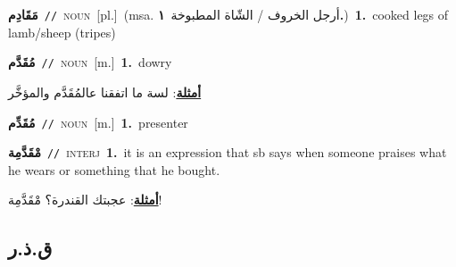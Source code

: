 \documentclass[10pt,a4paper,twoside]{article} %
\begin{document}
\begin{multicols}{2}
{\setlength\topsep{0pt}\textbf{\foreignlanguage{arabic}{مَقَادِم}}\ {\color{gray}\texttt{//}\color{black}}\ \textsc{noun}\ [pl.]\ \color{gray}(msa. \foreignlanguage{arabic}{أرجل الخروف / الشّاة المطبوخة}~\foreignlanguage{arabic}{\textbf{١.}})\color{black}\ \textbf{1.}~cooked legs of lamb/sheep (tripes)\ } \vspace{2mm}

{\setlength\topsep{0pt}\textbf{\foreignlanguage{arabic}{مُقَدَّم}}\ {\color{gray}\texttt{//}\color{black}}\ \textsc{noun}\ [m.]\ \textbf{1.}~dowry\  \begin{flushright}\color{gray}\foreignlanguage{arabic}{\textbf{\underline{\foreignlanguage{arabic}{أمثلة}}}: لسة ما اتفقنا عالمُقَدَّم والمؤخَّر}\end{flushright}\color{black}} \vspace{2mm}

{\setlength\topsep{0pt}\textbf{\foreignlanguage{arabic}{مُقَدِّم}}\ {\color{gray}\texttt{//}\color{black}}\ \textsc{noun}\ [m.]\ \textbf{1.}~presenter\ } \vspace{2mm}

{\setlength\topsep{0pt}\textbf{\foreignlanguage{arabic}{مْقَدَّمِة}}\ {\color{gray}\texttt{//}\color{black}}\ \textsc{interj}\ \textbf{1.}~it is an expression that sb says when someone praises what he wears or something that he bought.\  \begin{flushright}\color{gray}\foreignlanguage{arabic}{\textbf{\underline{\foreignlanguage{arabic}{أمثلة}}}: عجبتك القندرة؟ مْقَدَّمِة!}\end{flushright}\color{black}} \vspace{2mm}

\vspace{-3mm}
\subsection*{\color{blue}\foreignlanguage{arabic}{ق.ذ.ر}\color{blue}{}} 


\end{multicols}
\end{document}
